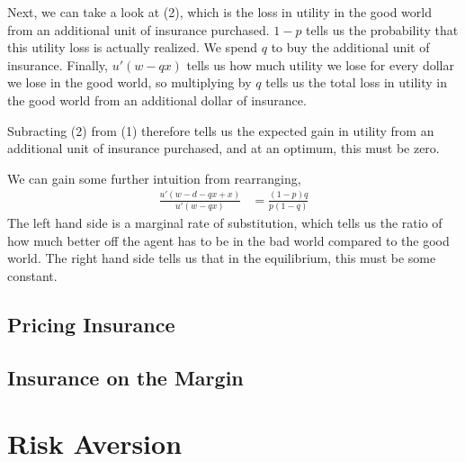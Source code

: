 Next, we can take a look at (2), which is the loss in utility in the good world from an additional unit of insurance purchased. $1 - p$ tells us the probability that this utility loss is actually realized. We spend $q$ to buy the additional unit of insurance. Finally, $u'(w - qx)$ tells us how much utility we lose for every dollar we lose in the good world, so multiplying by $q$ tells us the total loss in utility in the good world from an additional dollar of insurance.

Subracting (2) from (1) therefore tells us the expected gain in utility from an additional unit of insurance purchased, and at an optimum, this must be zero.

We can gain some further intuition from rearranging,
\begin{align*}
    \frac{u'(w - d - qx + x)}{u'(w - qx)} &= \frac{(1 - p)q}{p(1 - q)}
\end{align*}
The left hand side is a marginal rate of substitution, which tells us the ratio of how much better off the agent has to be in the bad world compared to the good world. The right hand side tells us that in the equilibrium, this must be some constant.

\subsection*{Pricing Insurance}

\subsection*{Insurance on the Margin}

\section{Risk Aversion} \label{sec:risk_aversion}
